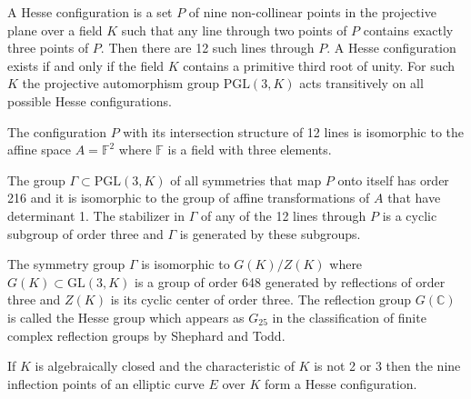 \documentclass[12pt]{article}
\begin{document}
A Hesse configuration is a set $P$ of nine non-collinear points in the projective plane over a field $K$ such that any line through two points of $P$ contains exactly three points of $P$.  Then there are 12 such lines through $P$.  A Hesse configuration exists if and only if the field $K$ contains a primitive third root of unity.  For such $K$ the projective automorphism group $\mathrm{PGL}(3, K)$ acts transitively on all possible Hesse configurations.

The configuration $P$ with its intersection structure of 12 lines is isomorphic to the affine space $A = \mathbb{F}^2$ where $\mathbb{F}$ is a field with three elements.

The group $\Gamma \subset \mathrm{PGL}(3, K)$ of all symmetries that map $P$ onto itself has order 216 and it is isomorphic to the group of affine transformations of $A$ that have determinant 1.  The stabilizer in $\Gamma$ of any of the 12 lines through $P$ is a cyclic subgroup of order three and $\Gamma$ is generated by these subgroups.

The symmetry group $\Gamma$ is isomorphic to $G(K)/Z(K)$ where $G(K) \subset \mathrm{GL}(3, K)$ is a group of order 648 generated by reflections of order three and $Z(K)$ is its cyclic center of order three.  The reflection group $G(\mathbb{C})$ is called the Hesse group which appears as $G_{25}$ in the classification of finite complex reflection groups by Shephard and Todd.

If $K$ is algebraically closed and the characteristic of $K$ is not 2 or 3 then the nine inflection points of an elliptic curve $E$ over $K$ form a Hesse configuration.
\end{document}
